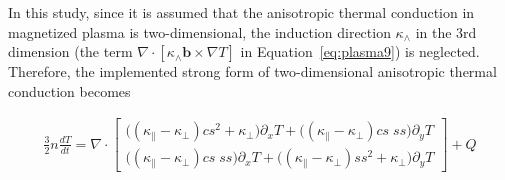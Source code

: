 \documentclass[runningheads]{llncs}
\begin{document}
In this study, since it is assumed that the anisotropic thermal conduction in magnetized plasma is two-dimensional, the induction direction $\kappa_{\wedge}$ in the 3rd dimension (the term $\nabla \cdot [\kappa_{\wedge}\bm{b}\times\nabla T]$ in Equation~\eqref{eq:plasma9}) is neglected. Therefore, the implemented strong form of two-dimensional anisotropic thermal conduction becomes

\begin{eqnarray}
\frac{3}{2} n \frac{dT}{dt} = \nabla \cdot \begin{bmatrix}
\big((\kappa_{\parallel}-\kappa_{\perp}) cs^2 + \kappa_{\perp}\big)\partial_x T + \big((\kappa_{\parallel}-\kappa_{\perp}) cs\; ss\big)\partial_y T\\
\big((\kappa_{\parallel}-\kappa_{\perp}) cs\; ss\big)\partial_x T + \big((\kappa_{\parallel}-\kappa_{\perp}) ss^2 + \kappa_{\perp})\partial_y T 
\end{bmatrix} + Q \label{eq:plasma10}
\end{eqnarray} 
\end{document}
